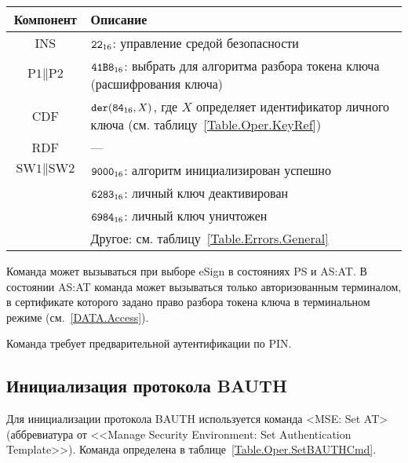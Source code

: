 \begin{table}[hbt]
\caption{}\label{Table.Oper.SetCTCmd}
\begin{tabular}{|c|p{14cm}|}
\hline
Компонент & Описание \\
\hline
\hline
INS & $\texttt{22}_{16}$: управление средой безопасности\\ 
\hline
$\text{P1} \parallel\text{P2}$ & $\texttt{41B8}_{16}$: 
выбрать для алгоритма разбора токена ключа
(расшифрования ключа) \\
\hline
CDF & 
$\texttt{der}(\texttt{84}_{16}, X)$, 
где $X$ определяет идентификатор личного ключа
(см. таблицу~\ref{Table.Oper.KeyRef})\\
\hline
RDF &  --- \\
\hline
$\text{SW1} \parallel \text{SW2}$ & 
$\texttt{9000}_{16}$: алгоритм инициализирован успешно \\
\cline{2-2}
  & $\texttt{6283}_{16}$: личный ключ деактивирован \\
\cline{2-2}
  & $\texttt{6984}_{16}$: личный ключ уничтожен \\
\cline{2-2}
  & Другое: см. таблицу~\ref{Table.Errors.General} \\
\hline
\end{tabular}
\end{table}

Команда может вызываться при выборе eSign в состояниях PS и AS:AT. В состоянии 
AS:AT команда может вызываться только авторизованным терминалом, в сертификате 
которого задано право разбора токена ключа в терминальном режиме 
(см.~\ref{DATA.Access}). 

Команда требует предварительной аутентификации по PIN. 

\subsection{Инициализация протокола BAUTH}
\label{Oper.Descr.SetBAUTH}

Для инициализации протокола BAUTH используется команда <MSE: Set AT> 
(аббревиатура от <<Manage Security Environment: Set Authentication Template>>).
Команда определена в таблице~\ref{Table.Oper.SetBAUTHCmd}.

